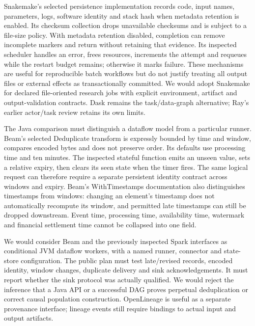 Snakemake's selected persistence implementation records code, input names, parameters, logs, software identity and stack hash when metadata retention is enabled. Its checksum collection drops unavailable checksums and is subject to a file-size policy. With metadata retention disabled, completion can remove incomplete markers and return without retaining that evidence. Its inspected scheduler handles an error, frees resources, increments the attempt and requeues while the restart budget remains; otherwise it marks failure. These mechanisms are useful for reproducible batch workflows but do not justify treating all output files or external effects as transactionally committed. We would adopt Snakemake for declared file-oriented research jobs with explicit environment, artifact and output-validation contracts. Dask remains the task/data-graph alternative; Ray's earlier actor/task review retains its own limits.~\citep{exec25_dww_snakemake,exec24_ray_sources,exec24_ray_contract}

The Java comparison must distinguish a dataflow model from a particular runner. Beam's selected Deduplicate transform is expressly bounded by time and window, compares encoded bytes and does not preserve order. Its defaults use processing time and ten minutes. The inspected stateful function emits an unseen value, sets a relative expiry, then clears its seen state when the timer fires. The same logical request can therefore require a separate persistent identity contract across windows and expiry. Beam's WithTimestamps documentation also distinguishes timestamps from windows: changing an element's timestamp does not automatically recompute its window, and permitted late timestamps can still be dropped downstream. Event time, processing time, availability time, watermark and financial settlement time cannot be collapsed into one field.~\citep{exec25_dww_beam}

We would consider Beam and the previously inspected Spark interfaces as conditional JVM dataflow workers, with a named runner, connector and state-store configuration. The public plan must test late/revised records, encoded identity, window changes, duplicate delivery and sink acknowledgements. It must report whether the sink protocol was actually qualified. We would reject the inference that a Java API or a successful DAG proves perpetual deduplication or correct causal population construction. OpenLineage is useful as a separate provenance interface; lineage events still require bindings to actual input and output artifacts.~\citep{exec25_otm_spark,exec24_openlineage_source,exec24_openlineage_reference,exec25_dww_choice}

